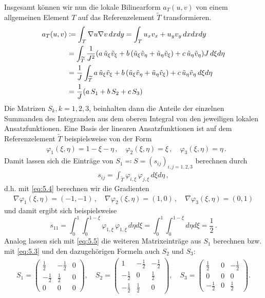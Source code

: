 Insgesamt können wir nun die lokale Bilinearform $a_T(u,v)$ von einem allgemeinen Element $T$ auf das Referenzelement $\widetilde T$ transformieren.
\begin{align}\notag
	a_T (u,v) &\coloneqq \int_T \nabla u \nabla v \, dx dy= \int_T u_xv_x + u_yv_y \, dxdxdy \\
	\notag
	& = \int_{\widetilde T} \frac 1{J^2} (a\, \tilde u_\xi \tilde v_\xi + b\, (\tilde u_\xi \tilde v_\eta + \tilde u_\eta \tilde v_\xi) + c\,  \tilde u_\eta \tilde v_\eta ) J \, d\xi d\eta \\
	\notag
	& = \frac 1J \int_{\widetilde T} a\, \tilde u_\xi \tilde v_\xi + b\, (\tilde u_\xi \tilde v_\eta + \tilde u_\eta \tilde v_\xi) + c\,  \tilde u_\eta \tilde v_\eta  \, d\xi d\eta \\
	\label{eq:5.3}
	& = \frac 1J (a \, S_1 + b \, S_2 + c \, S_3)
\end{align}
Die Matrizen $S_k,k=1,2,3$, beinhalten dann die Anteile der einzelnen Summanden des Integranden aus dem oberen Integral von den jeweiligen lokalen Ansatzfunktionen. Eine Basis der linearen Ansatzfunktionen ist auf dem Referenzelement $\widetilde T$ beispielsweise von der Form
\begin{align}\label{eq:5.4}
	& \varphi_1(\xi,\eta) = 1-\xi-\eta \, ,\quad \varphi_2(\xi,\eta) = \xi \, , \quad \varphi_3(\xi,\eta) = \eta \, .
\end{align}
Damit lassen sich die Einträge von $S_1 \eqqcolon S = (s_{ij})_{i,j=1,2,3}$ berechnen durch
\begin{align}\label{eq:5.5}
	s_{ij} = \int_{\widetilde T} \varphi_{i,\xi} \, \varphi_{j,\xi} \, d\xi d\eta \, ,
\end{align}
d.h. mit \eqref{eq:5.4} berechnen wir die Gradienten
\begin{align*}
	  \nabla \varphi_1(\xi,\eta) = (-1,-1) \, , \quad \nabla \varphi_2(\xi,\eta) = (1,0) \, , \quad \nabla \varphi_3(\xi,\eta) = (0,1)
\end{align*}
und damit ergibt sich beispielsweise
\[
	s_{11} = \int_0^1 \int_0^{1-\xi} \varphi_{1,\xi} \, \varphi_{1,\xi} \, d\eta d\xi = \int_0^1 \int_0^{1-\xi} d\eta d\xi = \frac 12 \, .
\]
Analog lassen sich mit \eqref{eq:5.5} die weiteren Matrixeinträge aus $S_1$ berechnen bzw. mit \eqref{eq:5.3} und den dazugehörigen Formeln auch $S_2$ und $S_3$:
\begin{align*}
	S_1 = \begin{pmatrix}
				\frac 12 & -\frac 12 & 0 \\
				-\frac 12 & \frac 12 & 0 \\
				0 & 0 & 0
			\end{pmatrix} , \quad 
			S_2 = \begin{pmatrix}
				 1 & -\frac 12 & -\frac 12 \\
				-\frac 12 & 0 & \frac 12 \\
				-\frac 12 & \frac 12 & 0
			\end{pmatrix} , \quad 
			S_3 = \begin{pmatrix}
				\frac 12 & 0 & -\frac 12 \\
				0 & 0 & 0 \\
				-\frac 12 & 0 & \frac 12
			\end{pmatrix} .
\end{align*}
